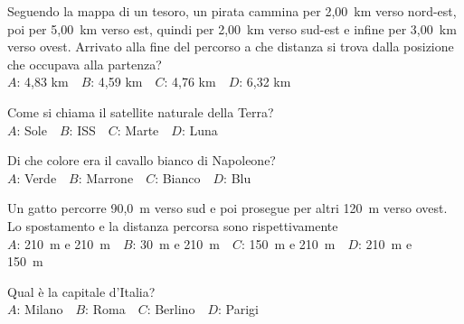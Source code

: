 \def\mcquestionnumber{1}


\mcquestionheader Seguendo la mappa di un tesoro, un pirata cammina per 2,00~km verso nord-est, poi per 5,00~km verso est, quindi per 2,00~km verso sud-est e infine per 3,00~km verso ovest. Arrivato alla fine del percorso a che distanza si trova dalla posizione che occupava alla partenza?\\
{$A$}: 4,83 km\ \ {$B$}: 4,59 km\ \ {$C$}: 4,76 km\ \ {$D$}: 6,32 km\ \ 

\mcquestionfooter



\def\mcquestionnumber{2}


\mcquestionheader Come si chiama il satellite naturale della Terra?\\
{$A$}: Sole\ \ {$B$}: ISS\ \ {$C$}: Marte\ \ {$D$}: Luna\ \ 

\mcquestionfooter



\def\mcquestionnumber{3}


\mcquestionheader Di che colore era il cavallo bianco di Napoleone?\\
{$A$}: Verde\ \ {$B$}: Marrone\ \ {$C$}: Bianco\ \ {$D$}: Blu\ \ 

\mcquestionfooter



\def\mcquestionnumber{4}


\mcquestionheader Un gatto percorre 90,0~m verso sud e poi prosegue per altri 120~m verso ovest. Lo spostamento e la distanza percorsa sono rispettivamente\\
{$A$}: 210~m e 210~m\ \ {$B$}: 30~m e 210~m\ \ {$C$}: 150~m e 210~m\ \ {$D$}: 210~m e 150~m\ \ 

\mcquestionfooter



\def\mcquestionnumber{5}


\mcquestionheader Qual è la capitale d’Italia?\\
{$A$}: Milano\ \ {$B$}: Roma\ \ {$C$}: Berlino\ \ {$D$}: Parigi\ \ 

\mcquestionfooter



\def\mcquestionnumber{6}



